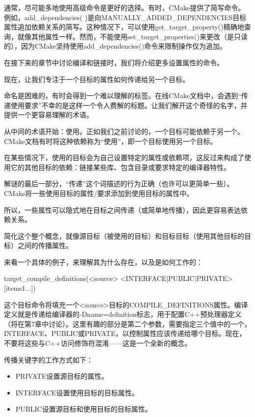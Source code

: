 通常，尽可能多地使用高级命令是更好的选择。有时，CMake提供了简写命令。例如，add\_dependencies( )是向MANUALLY\_ADDED\_DEPENDENCIES目标属性追加依赖关系的简写。这种情况下，可以使用get\_target\_property()精确地查询，就像其他属性一样。然而，不能使用set\_target\_properties()来更改（是只读的），因为CMake坚持使用add\_dependencies()命令来限制操作仅为追加。

在接下来的章节中讨论编译和链接时，我们将介绍更多设置属性的命令。

现在，让我们专注于一个目标的属性如何传递给另一个目标。


命名是困难的，有时会得到一个难以理解的标签。在线CMake文档中，会遇到“传递使用要求”不幸的是这样一个令人费解的标题。让我们解开这个奇怪的名字，并提供一个更容易理解的术语。

从中间的术语开始：使用。正如我们之前讨论的，一个目标可能依赖于另一个。CMake文档有时将这种依赖称为“使用”，即一个目标使用另一个目标。

在某些情况下，使用的目标会为自己设置特定的属性或依赖项，这反过来构成了使用它的其他目标的依赖：链接某些库、包含目录或要求特定的编译器特性。

解谜的最后一部分，“传递”这个词描述的行为正确（也许可以更简单一些）。CMake将一些使用目标的属性/要求添加到使用目标的属性中。

所以，一些属性可以隐式地在目标之间传递（或简单地传播），因此更容易表达依赖关系。

简化这个整个概念，就像源目标（被使用的目标）和目标目标（使用其他目标的目标）之间的传播属性。

来看一个具体的例子，来理解其为什么存在，以及是如何工作的：

\begin{shell}
target_compile_definitions(<source> <INTERFACE|PUBLIC|PRIVATE> [items1...])
\end{shell}

这个目标命令将填充一个<source>目标的COMPILE\_DEFINITIONS属性。编译定义就是传递给编译器的-Dname=definition标志，用于配置C++预处理器定义（将在第7章中讨论）。这里有趣的部分是第二个参数，需要指定三个值中的一个，INTERFACE、PUBLIC或PRIVATE，以控制属性应该传递给哪个目标。现在，不要将这些与C++访问修饰符混淆——这是一个全新的概念。

传播关键字的工作方式如下：

\begin{itemize}
\item
PRIVATE设置源目标的属性。

\item
INTERFACE设置使用目标的目标属性。

\item
PUBLIC设置源目标和使用目标的目标属性。
\end{itemize}

